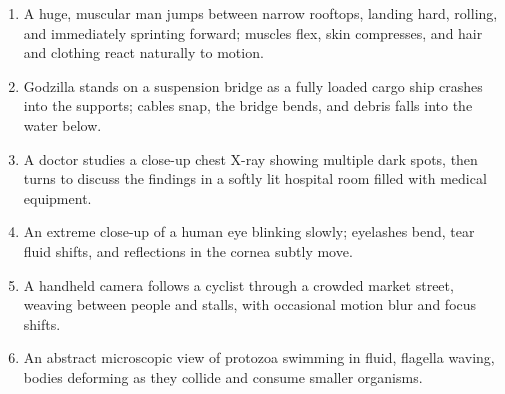 \documentclass[sigconf]{acmart}
\begin{document}
\begin{enumerate}[label=\textbf{Stress Test \arabic*}, leftmargin=*]

    \item
          A huge, muscular man jumps between narrow rooftops, landing hard, rolling, and immediately sprinting forward; muscles flex, skin compresses, and hair and clothing react naturally to motion.


    \item
          Godzilla stands on a suspension bridge as a fully loaded cargo ship crashes into the supports; cables snap, the bridge bends, and debris falls into the water below.




    \item
          A doctor studies a close-up chest X-ray showing multiple dark spots, then turns to discuss the findings in a softly lit hospital room filled with medical equipment.



    \item
          An extreme close-up of a human eye blinking slowly; eyelashes bend, tear fluid shifts, and reflections in the cornea subtly move.



    \item
          A handheld camera follows a cyclist through a crowded market street, weaving between people and stalls, with occasional motion blur and focus shifts.



    \item
          An abstract microscopic view of protozoa swimming in fluid, flagella waving, bodies deforming as they collide and consume smaller organisms.




\end{enumerate}
\end{document}
